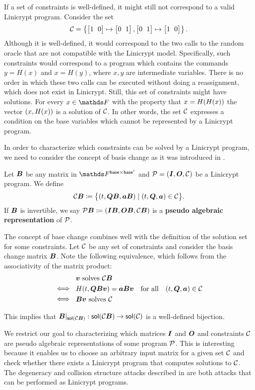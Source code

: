 If a set of constraints is well-defined, it might still not correspond to a valid Linicrypt program.
Consider the set
\[
\C = \left\{ \m{1&0} \mapsto \m{0&1}, \m{0&1} \mapsto \m{1&0}\right\}.
\]
Although it is well-defined,
it would correspond to the two calls to the random oracle that are not compatible with the Linicrypt model.
Specifically, such constraints would correspond to a program which contains the commands
$y = H(x)$ and $x = H(y)$, where $x,y$ are intermediate variables.
There is no order in which these two calls can be executed without doing a reassignment,
which does not exist in Linicrypt.
Still, this set of constraints might have solutions.
For every $x \in \F$ with the property that $x = \H(\H(x))$ the vector $(x, \H(x))$ is a solution of $\C$.
In other words,
the set $\C$ expresses a condition on the base variables which cannot be represented by a Linicrypt program.

In order to characterize which constraints can be solved by a Linicrypt program,
we need to consider the concept of basis change as it was introduced in \cite{C:CarRos16}.

\begin{defn}
    Let $\v B$ be any matrix in $\F^{\base \times \base'}$
    and $\P = (\Inp, \O, \C)$ be a Linicrypt program.
    We define 
    \[
        \C \B \coloneqq \big\{ (t, \Q \B, \va \B) \mid (t, \Q, \va) \in \C \big\}.
    \]
    If $\B$ is invertible,
    we say $\P\B \coloneqq (\Inp \B, \O \B, \C \B)$ is a \textbf{pseudo algebraic representation} of $\P$.
\end{defn}

The concept of base change combines well with the definition of the solution set for some constraints.
Let $\C$ be any set of constraints and consider the basis change matrix $\B$.
Note the following equivalence, which follows from the associativity of the matrix product:
\begin{align*}
&\parbox{30pt}{\phantom{$\iff$}} \vv \textrm{ solves } \C\B \\
&\parbox{30pt}{$\iff$} \H(t, \Q \B \vv) = \va \B \vv \quad \textrm{for all} \quad (t, \Q, \va) \in \C \\
&\parbox{30pt}{$\iff$} \B \vv \textrm{ solves } \C
\end{align*}

This implies that $\B|_{\sol(\C\B)}: \sol(\C\B) \to \sol(\C)$ is a well-defined bijection.

We restrict our goal to characterizing which matrices $\I$ and $\O$ and constraints $\C$ are pseudo algebraic representations of some program $\P$. 
This is interesting because it enables us to choose an arbitrary input matrix for a given set $\C$ and check whether there exists a Linicrypt program that computes solutions to $\C$.
The degeneracy and collision structure attacks described in \cite{TCC:McQSwoRos19} are both attacks that can be performed as Linicrypt programs.


